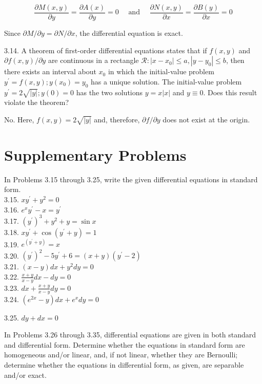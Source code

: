 \documentclass[10pt]{article}
\begin{document}
$$
\frac{\partial M(x, y)}{\partial y}=\frac{\partial A(x)}{\partial y}=0 \quad \text { and } \quad \frac{\partial N(x, y)}{\partial x}=\frac{\partial B(y)}{\partial x}=0
$$

Since $\partial M / \partial y=\partial N / \partial x$, the differential equation is exact.

3.14. A theorem of first-order differential equations states that if $f(x, y)$ and $\partial f(x, y) / \partial y$ are continuous in a rectangle $\mathscr{R}:\left|x-x_{0}\right| \leq a,\left|y-y_{0}\right| \leq b$, then there exists an interval about $x_{0}$ in which the initial-value problem $y^{\prime}=f(x, y) ; y\left(x_{0}\right)=y_{0}$ has a unique solution. The initial-value problem $y^{\prime}=2 \sqrt{|y|} ; y(0)=0$ has the two solutions $y=x|x|$ and $y \equiv 0$. Does this result violate the theorem?

No. Here, $f(x, y)=2 \sqrt{|y|}$ and, therefore, $\partial f / \partial y$ does not exist at the origin.

\section*{Supplementary Problems}
In Problems 3.15 through 3.25, write the given differential equations in standard form.\\
3.15. $x y^{\prime}+y^{2}=0$\\
3.16. $e^{x} y^{\prime}-x=y^{\prime}$\\
3.17. $\left(y^{\prime}\right)^{3}+y^{2}+y=\sin x$\\
3.18. $x y^{\prime}+\cos \left(y^{\prime}+y\right)=1$\\
3.19. $e^{\left(y^{\prime}+y\right)}=x$\\
3.20. $\left(y^{\prime}\right)^{2}-5 y^{\prime}+6=(x+y)\left(y^{\prime}-2\right)$\\
3.21. $(x-y) d x+y^{2} d y=0$\\
3.22. $\frac{x+y}{x-y} d x-d y=0$\\
3.23. $d x+\frac{x+y}{x-y} d y=0$\\
3.24. $\left(e^{2 x}-y\right) d x+e^{x} d y=0$

3.25. $d y+d x=0$

In Problems 3.26 through 3.35, differential equations are given in both standard and differential form. Determine whether the equations in standard form are homogeneous and/or linear, and, if not linear, whether they are Bernoulli; determine whether the equations in differential form, as given, are separable and/or exact.
\end{document}
